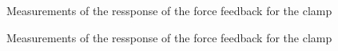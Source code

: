 \begin{minipage}{0.5\linewidth}
\begin{figure}[H]
\centering
\resizebox{0.9\textwidth}{!}{
}
\caption{Measurements of the ressponse of the force feedback for the clamp}
\end{figure}
\end{minipage}
\begin{minipage}{0.5\linewidth}
\begin{figure}[H]
\centering
\resizebox{0.75\textwidth}{!}{
}
\caption{Measurements of the ressponse of the force feedback for the clamp}
\end{figure}
\end{minipage}

